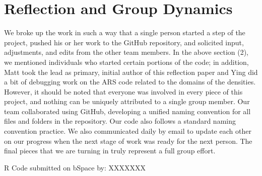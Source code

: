 \documentclass{article}
\begin{document}
\section{Reflection and Group Dynamics}
We broke up the work in such a way that a single person started a step of the project, pushed his or her work to the GitHub repository, and solicited input, adjustments, and edits from the other team members.  In the above section (2), we mentioned individuals who started certain portions of the code; in addition, Matt took the lead as primary, initial author of this reflection paper and Ying did a bit of debugging work on the ARS code related to the domains of the densities.  However, it should be noted that everyone was involved in every piece of this project, and nothing can be uniquely attributed to a single group member.  Our team collaborated using GitHub, developing a unified naming convention for all files and folders in the repository. Our code also follows a standard naming convention practice.  We also communicated daily by email to update each other on our progress when the next stage of work was ready for the next person. The final pieces that we are turning in truly represent a full group effort. 

R Code submitted on bSpace by: XXXXXXX
\end{document}
